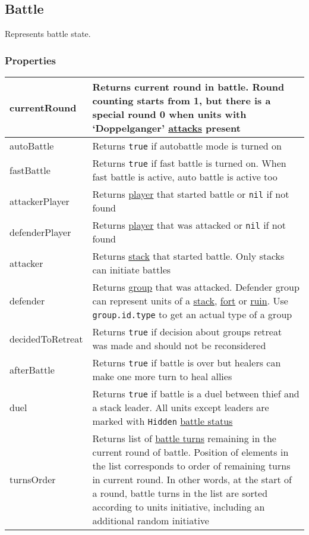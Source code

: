 \subsection{Battle}
\label{Battle}
Represents battle state.
\subsubsection{Properties}
\begin{center}
\begin{tabularx}{\linewidth}{| l | X |}
\hline
currentRound & Returns current round in battle. Round counting starts from 1, but there is a special round 0 when units with `Doppelganger' \hyperref[Attack]{attacks} present\\
\hline
autoBattle & Returns \texttt{true} if autobattle mode is turned on\\
\hline
fastBattle & Returns \texttt{true} if fast battle is turned on. When fast battle is active, auto battle is active too\\
\hline
attackerPlayer & Returns \hyperref[Player]{player} that started battle or \texttt{nil} if not found\\
\hline
defenderPlayer & Returns \hyperref[Player]{player} that was attacked or \texttt{nil} if not found\\
\hline
attacker & Returns \hyperref[Stack]{stack} that started battle. Only stacks can initiate battles\\
\hline
defender & Returns \hyperref[Group]{group} that was attacked. Defender group can represent units of a \hyperref[Stack]{stack}, \hyperref[Fort]{fort} or \hyperref[Ruin]{ruin}. Use \texttt{group.id.type} to get an actual type of a group\\
\hline
decidedToRetreat & Returns \texttt{true} if decision about groups retreat was made and should not be reconsidered\\
\hline
afterBattle & Returns \texttt{true} if battle is over but healers can make one more turn to heal allies\\
\hline
duel & Returns \texttt{true} if battle is a duel between thief and a stack leader. All units except leaders are marked with \texttt{Hidden} \hyperref[BattleStatus]{battle status}\\
\hline
turnsOrder & Returns list of \hyperref[BattleTurn]{battle turns} remaining in the current round of battle. Position of elements in the list corresponds to order of remaining turns in current round. In other words, at the start of a round, battle turns in the list are sorted according to units initiative, including an additional random initiative\\
\hline
\end{tabularx}
\end{center}

